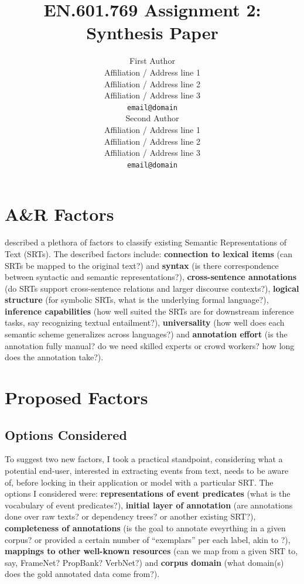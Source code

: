 \documentclass[11pt,a4paper]{article}
\title{EN.601.769 Assignment 2: Synthesis Paper}
\author{First Author \\
  Affiliation / Address line 1 \\
  Affiliation / Address line 2 \\
  Affiliation / Address line 3 \\
  \texttt{email@domain} \\\And
  Second Author \\
  Affiliation / Address line 1 \\
  Affiliation / Address line 2 \\
  Affiliation / Address line 3 \\
  \texttt{email@domain} \\}
\date{}
\begin{document}
\maketitle

\section{A\&R Factors}\label{sec:ar-factors}

 described a plethora of factors to classify existing Semantic Representations of Text (SRTs). The described factors include: \textbf{connection to lexical items} (can SRTs be mapped to the original text?) and \textbf{syntax} (is there correspondence between syntactic and semantic representations?), \textbf{cross-sentence annotations} (do SRTs support cross-sentence relations and larger discourse contexts?), \textbf{logical structure} (for symbolic SRTs, what is the underlying formal language?), \textbf{inference capabilities} (how well suited the SRTs are for downstream inference tasks, say recognizing textual entailment?), \textbf{universality} (how well does each semantic scheme generalizes across languages?) and \textbf{annotation effort} (is the annotation fully manual? do we need skilled experts or crowd workers? how long does the annotation take?).

\section{Proposed Factors}\label{sec:proposed-factors}
\subsection{Options Considered}

To suggest two new factors, I took a practical standpoint, considering what a potential end-user, interested in extracting events from text, needs to be aware of, before locking in their application or model with a particular SRT. The options I considered were: \textbf{representations of event predicates} (what is the vocabulary of event predicates?), \textbf{initial layer of annotation} (are annotations done over raw texts? or dependency trees? or another existing SRT?), \textbf{completeness of annotations} (is the goal to annotate eveyrthing in a given corpus? or provided a certain number of ``exemplars'' per each label, akin to \cite{baker-etal-1998-berkeley-framenet}?), \textbf{mappings to other well-known resources} (can we map from a given SRT to, say, FrameNet? PropBank? VerbNet?) and \textbf{corpus domain} (what domain(s) does the gold annotated data come from?).
\end{document}
